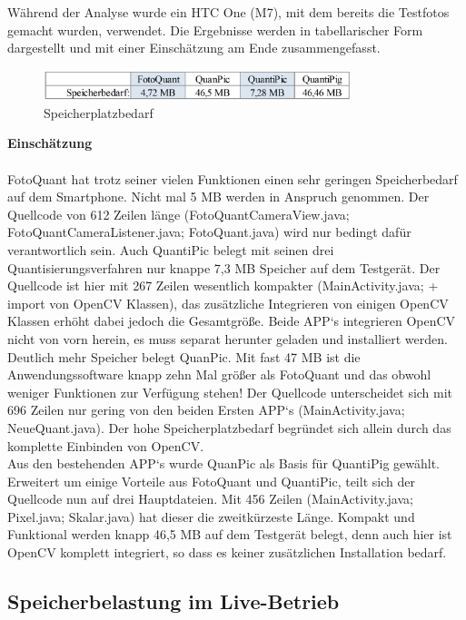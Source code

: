 Während der Analyse wurde ein HTC One (M7), mit dem bereits die Testfotos gemacht wurden, verwendet. Die Ergebnisse werden in tabellarischer Form dargestellt und mit einer Einschätzung am Ende zusammengefasst.

\begin{figure}[h]
	\centering
		\includegraphics[width=0.8\textwidth]{img/speicherplatzbedarf_klein.png}
	\caption[Speicherplatzbedarf]{Speicherplatzbedarf}
	\label{fig:speicher_apps}
\end{figure}


\textbf{Einschätzung}
\\
\\
FotoQuant hat trotz seiner vielen Funktionen einen sehr geringen Speicherbedarf auf dem Smartphone. Nicht mal 5 MB werden in Anspruch genommen. Der Quellcode von 612 Zeilen länge (FotoQuantCameraView.java; FotoQuantCameraListener.java; FotoQuant.java) wird nur bedingt dafür verantwortlich sein. Auch QuantiPic belegt mit seinen drei Quantisierungsverfahren nur knappe 7,3 MB Speicher auf dem Testgerät. Der Quellcode ist hier mit 267 Zeilen wesentlich kompakter (MainActivity.java; + import von OpenCV Klassen), das zusätzliche Integrieren von einigen OpenCV Klassen erhöht dabei jedoch die Gesamtgröße. Beide APP‘s integrieren OpenCV nicht von vorn herein, es muss separat herunter geladen und installiert werden.
\\
Deutlich mehr Speicher belegt QuanPic. Mit fast 47 MB ist die Anwendungssoftware knapp zehn Mal größer als FotoQuant und das obwohl weniger Funktionen zur Verfügung stehen! Der Quellcode unterscheidet sich mit 696 Zeilen nur gering von den beiden Ersten APP‘s (MainActivity.java; NeueQuant.java). Der hohe Speicherplatzbedarf begründet sich allein durch das komplette Einbinden von OpenCV. 
\\
Aus den bestehenden APP‘s wurde QuanPic als Basis für QuantiPig gewählt. Erweitert um einige Vorteile aus FotoQuant und QuantiPic, teilt sich der Quellcode nun auf drei Hauptdateien. Mit 456 Zeilen (MainActivity.java; Pixel.java; Skalar.java) hat dieser die zweitkürzeste Länge. Kompakt und Funktional werden knapp 46,5 MB auf dem Testgerät belegt, denn auch hier ist OpenCV komplett integriert, so dass es keiner zusätzlichen Installation bedarf.

\subsection{\textbf{Speicherbelastung im Live-Betrieb}}

